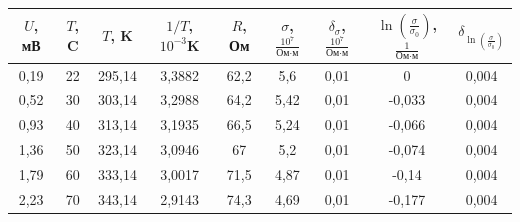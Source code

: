 \documentclass[a4paper, 12pt]{article}%
\begin{document}
\begin{table}[h]
\begin{tabular}{|c|c|c|c|c|c|c|c|c|}
\hline
$U$, мВ & $T$, C & $T$, K & $1/T$, $10^{-3}$K & $R$, Ом & $\sigma$, $\frac{10^7}{\text{Ом} \cdot   \text{м}}$ & $\delta_{\sigma}$, $\frac{10^7}{\text{Ом}   \cdot \text{м}}$ & $\ln\left(\frac{\sigma}{\sigma_0}\right)$,   $\frac{1}{\text{Ом} \cdot \text{м}}$ & $\delta_{\ln\left(\frac{\sigma}{\sigma_0}\right)}$ \\ \hline
0,19    & 22     & 295,14 & 3,3882            & 62,2    & 5,6                                                 & 0,01                                                         & 0                                                                                 & 0,004                                              \\ \hline
0,52    & 30     & 303,14 & 3,2988            & 64,2    & 5,42                                                & 0,01                                                         & -0,033                                                                            & 0,004                                              \\ \hline
0,93    & 40     & 313,14 & 3,1935            & 66,5    & 5,24                                                & 0,01                                                         & -0,066                                                                            & 0,004                                              \\ \hline
1,36    & 50     & 323,14 & 3,0946            & 67      & 5,2                                                 & 0,01                                                         & -0,074                                                                            & 0,004                                              \\ \hline
1,79    & 60     & 333,14 & 3,0017            & 71,5    & 4,87                                                & 0,01                                                         & -0,14                                                                             & 0,004                                              \\ \hline
2,23    & 70     & 343,14 & 2,9143            & 74,3    & 4,69                                                & 0,01                                                         & -0,177                                                                            & 0,004                                              \\ \hline

\end{tabular}
\end{table}
\end{document}
